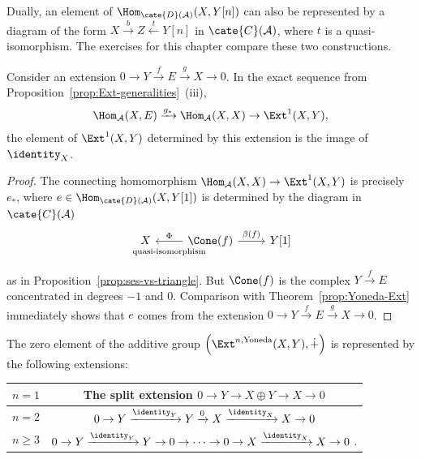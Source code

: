 Dually, an element of $\Hom_{\cate{D}(\mathcal{A})}(X,Y[n])$ can also be
represented by a diagram of the form
$X\xrightarrow{b}Z\xleftarrow{t}Y[n]$ in $\cate{C}(\mathcal{A})$, where
$t$ is a quasi-isomorphism. The exercises for this chapter compare these
two constructions.

\begin{proposition}\label{prop:Ext1-via-ses}
	Consider an extension
	$0\to Y\xrightarrow{f}E\xrightarrow{g}X\to0$. In the exact sequence
	from Proposition~\ref{prop:Ext-generalities}~(iii),
	\begin{gather*}
		\Hom_{\mathcal{A}}(X,E) \xrightarrow{g_*} \Hom_{\mathcal{A}}(X,X) \to \Ext^1(X,Y),
	\end{gather*}
	the element of $\Ext^1(X,Y)$ determined by this extension is the image
	of $\identity_X$.
\end{proposition}

\begin{proof}
	The connecting homomorphism
	$\Hom_{\mathcal{A}}(X,X)\to\Ext^1(X,Y)$ is precisely $e_*$, where
	$e\in\Hom_{\cate{D}(\mathcal{A})}(X,Y[1])$ is determined by the diagram
	in $\cate{C}(\mathcal{A})$
	\[\begin{tikzcd}
		X & \Cone(f) \arrow[r, "{\beta(f)}"] \arrow[l, "\Phi"', "\text{quasi-isomorphism}" inner sep=0.6em] & {Y[1]}
	\end{tikzcd}\]
	as in Proposition~\ref{prop:ses-vs-triangle}. But $\Cone(f)$ is the
	complex $Y\xrightarrow{f}E$ concentrated in degrees $-1$ and $0$.
	Comparison with Theorem~\ref{prop:Yoneda-Ext} immediately shows that
	$e$ comes from the extension
	$0\to Y\xrightarrow{f}E\xrightarrow{g}X\to0$.
\end{proof}

\begin{proposition}\label{prop:Yoneda-zero}
	The zero element of the additive group
	$\left(\Ext^{n,\text{Yoneda}}(X,Y),\dot{+}\right)$ is represented by
	the following extensions:
	\begin{center}\begin{tabular}{|c|c|} \hline
		$n = 1$ & The split extension $0 \to Y \to X \oplus Y \to X \to 0$ \\ \hline
		$n = 2$ & $0 \to Y \xrightarrow{\identity_Y} Y \xrightarrow{0} X \xrightarrow{\identity_X} X \to 0$ \\ \hline
		$n \geq 3$ & $0 \to Y \xrightarrow{\identity_Y} Y \to 0 \to \cdots \to 0 \to X \xrightarrow{\identity_X} X \to 0$ . \\ \hline
	\end{tabular}\end{center}
\end{proposition}

